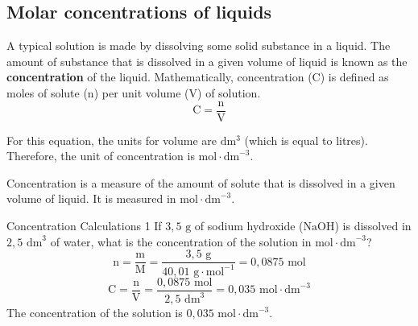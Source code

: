             \subsection*{Molar concentrations of liquids}
            \nopagebreak
      \label{m38712*id282848}A typical solution is made by dissolving some solid substance in a liquid. The amount of substance that is dissolved in a given volume of liquid is known as the \textbf{concentration} of the liquid. Mathematically, concentration (C) is defined as moles of solute (n) per unit volume (V) of solution.\\
      \label{m38712*id282860}\nopagebreak\noindent{}      
    \begin{equation*}
    \text{C}=\frac{\text{n}}{\text{V}}
      \end{equation*}
	\begin{figure}[H] %
\begin{center}
\end{center}
 \end{figure}
      \label{m38712*id282881}For this equation, the units for volume are $\text{dm}{}^{3}$ (which is equal to litres). Therefore, the unit of concentration is $\text{mol} \cdot {\text{dm}}^{-3}$.
	\par
\label{m38712*fhsst!!!underscore!!!id1650}
 {Concentration is a measure of the amount of solute that is dissolved in a given volume of liquid. It is measured in $\text{mol} \cdot {\text{dm}}^{-3}$.} 
 
      \noindent
      \begin{wex}{ Concentration Calculations 1 }
{
      \label{m38712*probfhsst!!!underscore!!!id1654}
      \label{m38712*id283003}If $3,5\text{ g}$ of sodium hydroxide ($\text{NaOH}$) is dissolved in $2,5 {\text{ dm}}^{3}$ of water, what is the concentration of the solution in $\text{mol}\ensuremath{\cdot}{\text{dm}}^{-3}$? 
}
{
      \label{m38712*id283067}\nopagebreak\noindent{}
    \begin{equation*}
    \text{n}=\frac{\text{m}}{\text{M}}=\frac{3,5 \text{ g}}{40,01 \text{ g} \cdot \text{mol}^{-1}} = 0,0875 \text{ mol}
      \end{equation*}
\begin{equation*}
\text{C}=\frac{\text{n}}{\text{V}}=\frac{0,0875 \text{ mol}}{2,5 \text{ dm}^{3} }=0,035 \text{ mol} \cdot \text{dm}^{-3}
\end{equation*}
The concentration of the solution is $0,035 \text{ mol} \cdot {\text{dm}}^{-3}$.
}
    \end{wex}

